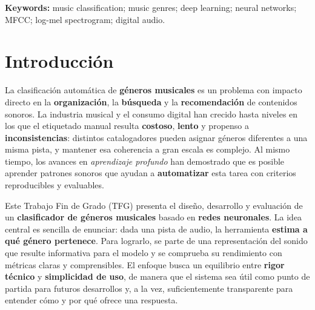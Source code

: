 \documentclass[12pt,twoside]{article}
\newenvironment{keywordsEN}{\par\noindent\textbf{Keywords: }\ignorespaces}{\par}
\begin{document}
\begin{keywordsEN}
music classification; music genres; deep learning; neural networks; MFCC; log-mel spectrogram; digital audio.
\end{keywordsEN}

\cleardoublepage
{}



\section{Introducción}

La clasificación automática de \textbf{géneros musicales} es un problema con impacto directo en la \textbf{organización}, la \textbf{búsqueda} y la \textbf{recomendación} de contenidos sonoros. La industria musical y el consumo digital han crecido hasta niveles en los que el etiquetado manual resulta \textbf{costoso}, \textbf{lento} y propenso a \textbf{inconsistencias}: distintos catalogadores pueden asignar géneros diferentes a una misma pista, y mantener esa coherencia a gran escala es complejo. Al mismo tiempo, los avances en \textit{aprendizaje profundo} han demostrado que es posible aprender patrones sonoros que ayudan a \textbf{automatizar} esta tarea con criterios reproducibles y evaluables.

Este Trabajo Fin de Grado (TFG) presenta el diseño, desarrollo y evaluación de un \textbf{clasificador de géneros musicales} basado en \textbf{redes neuronales}. La idea central es sencilla de enunciar: dada una pista de audio, la herramienta \textbf{estima a qué género pertenece}. Para lograrlo, se parte de una representación del sonido que resulte informativa para el modelo y se comprueba su rendimiento con métricas claras y comprensibles. El enfoque busca un equilibrio entre \textbf{rigor técnico} y \textbf{simplicidad de uso}, de manera que el sistema sea útil como punto de partida para futuros desarrollos y, a la vez, suficientemente transparente para entender cómo y por qué ofrece una respuesta.
\end{document}
